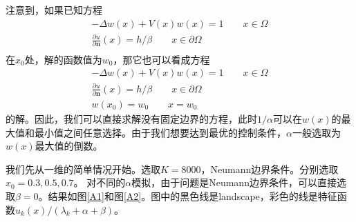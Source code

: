 \documentclass[12pt,a4paper]{article}
\begin{document}
注意到，如果已知方程
\begin{eqnarray}
- \Delta w(x) + V(x) w(x) = 1 \qquad x \in \Omega \\
\frac{\partial u}{\partial \mathbf{n}}(x) = h / \beta \qquad x \in \partial \Omega \\
\end{eqnarray}
在$x_0$处，解的函数值为$w_0$，那它也可以看成方程
\begin{eqnarray}
- \Delta w(x) + V(x) w(x) = 1 \qquad x \in \Omega \\
\frac{\partial u}{\partial \mathbf{n}}(x) = h / \beta \qquad x \in \partial \Omega \\
w(x_0) = w_0 \qquad x = w_0
\end{eqnarray}
的解。因此，我们可以直接求解没有固定边界的方程，此时$1/\alpha$可以在$w(x)$的最大值和最小值之间任意选择。由于我们想要达到最优的控制条件，$\alpha$一般选取为$w(x)$最大值的倒数。

我们先从一维的简单情况开始。选取$K = 8000$，Neumann边界条件。分别选取$x_0 = 0.3, 0.5, 0.7$。 对不同的$\alpha$模拟，由于问题是Neumann边界条件，可以直接选取$\beta = 0$。结果如图\ref{A1}和图\ref{A2}。图中的黑色线是landscape，彩色的线是特征函数$u_k(x) / (\lambda_k + \alpha + \beta)$。
\end{document}
